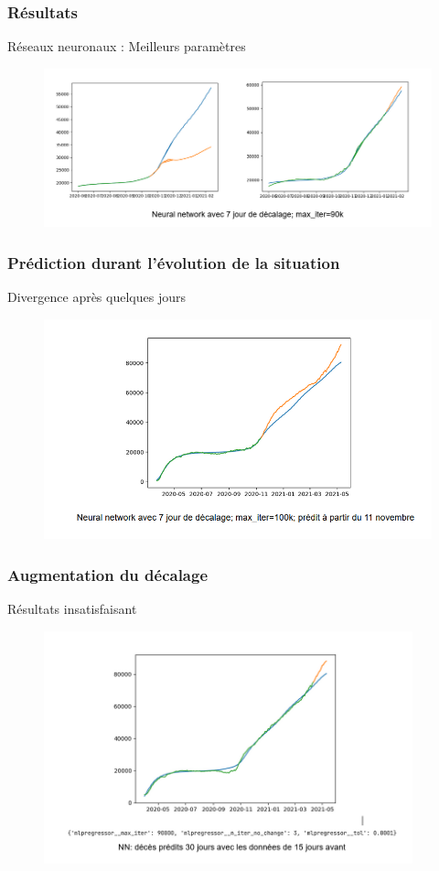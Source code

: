 \documentclass{beamer}
\begin{document}
\begin{frame}
	\frametitle{Résultats}
	Réseaux neuronaux : Meilleurs paramètres
	\begin{figure}
		\includegraphics[scale=0.6]{NN_3}
	\end{figure}
\end{frame}

\begin{frame}
	\frametitle{Prédiction durant l'évolution de la situation}
	Divergence après quelques jours
	\begin{figure}[h]
		\centering
		\includegraphics[width=\textwidth]{NN_1}
	\end{figure}
\end{frame}

\begin{frame}
	\frametitle{Augmentation du décalage}
	Résultats insatisfaisant
	\begin{figure}
		\includegraphics[width=0.95\textwidth]{NN_2}
	\end{figure}
\end{frame}
\end{document}

